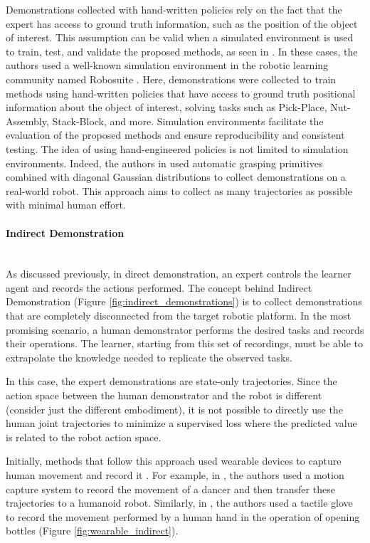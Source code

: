Demonstrations collected with hand-written policies rely on the fact that the expert has access to ground truth information, such as the position of the object of interest. This assumption can be valid when a simulated environment is used to train, test, and validate the proposed methods, as seen in \cite{dasari2021transformers_one_shot,mandi2022towards_more_generalizable_one_shot,chang2023one}. In these cases, the authors used a well-known simulation environment in the robotic learning community named Robosuite \cite{zhu2020robosuite}. Here, demonstrations were collected to train methods using hand-written policies that have access to ground truth positional information about the object of interest, solving tasks such as Pick-Place, Nut-Assembly, Stack-Block, and more. Simulation environments facilitate the evaluation of the proposed methods and ensure reproducibility and consistent testing. The idea of using hand-engineered policies is not limited to simulation environments. Indeed, the authors in \cite{dasari2020robonet} used automatic grasping primitives combined with diagonal Gaussian distributions to collect demonstrations on a real-world robot. This approach aims to collect as many trajectories as possible with minimal human effort.


\paragraph*{Indirect Demonstration}   \mbox{} \\ 
As discussed previously, in direct demonstration, an expert controls the learner agent and records the actions performed. The concept behind Indirect Demonstration (Figure \ref{fig:indirect_demonstrations}) is to collect demonstrations that are completely disconnected from the target robotic platform. In the most promising scenario, a human demonstrator performs the desired tasks and records their operations. The learner, starting from this set of recordings, must be able to extrapolate the knowledge needed to replicate the observed tasks.

In this case, the expert demonstrations are state-only trajectories. Since the action space between the human demonstrator and the robot is different (consider just the different embodiment), it is not possible to directly use the human joint trajectories to minimize a supervised loss where the predicted value is related to the robot action space.

Initially, methods that follow this approach used wearable devices to capture human movement and record it \cite{nakaoka2007learning,liu2019_mirroring_without_overimitation}. For example, in \cite{nakaoka2007learning}, the authors used a motion capture system to record the movement of a dancer and then transfer these trajectories to a humanoid robot. Similarly, in \cite{liu2019_mirroring_without_overimitation}, the authors used a tactile glove \cite{liu2017glove_force} to record the movement performed by a human hand in the operation of opening bottles (Figure \ref{fig:wearable_indirect}).


